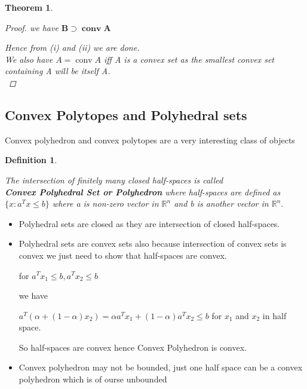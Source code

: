 \documentclass[oneside]{book}
\newtheorem{theorem}{Theorem}[section]
\newtheorem{mydef}{Definition}
\begin{document}
\begin{theorem}
\begin{proof}
we have  $ \mathbf{B} \supset \mathbf{\operatorname{conv} A}  $ \par
 Hence from (i) and (ii) we are done. \\
 We also have $A = \operatorname{conv} A$ iff A is a convex set as the smallest convex set containing A will be itself A. \\

 \end{proof}
 
\end{theorem}


 
 
 
 

 
 
 
 
 
 
 
 
 
 
 
 
 
 
 
 
 
 
 
 
 
 
 
 
 
 
 
\subsection{ Convex Polytopes and Polyhedral sets } \label{ss:16}
Convex polyhedron and convex polytopes are a very interesting class of objects 
\begin{mydef} \label{d:5}

The intersection of finitely many closed half-spaces is called \\
\textbf{ Convex Polyhedral Set  or Polyhedron}
 where half-spaces are defined as $\{ x : a^{T}x \leq b\} $  where a is non-zero vector in $\mathbb{R}^n$ and b is another vector in  $\mathbb{R}^n.$  
 
 
\end{mydef}


\begin{itemize}
\item
 Polyhedral sets are closed as they are intersection of closed half-spaces. 
  \item
 Polyhedral sets  are convex sets  also because intersection of convex sets is convex we just need to show that half-spaces are convex.\par
   for $a^{T} x_{1} \leq b, a^{T} x_{2} \leq b$ \par 
 we have 
 
 $a^{T}\left(\alpha +(1- \alpha) x_{2}\right)=\alpha a^{T} x_{1}+(1-\alpha) a^{T} x_{2} \leq b$ 
  for $x_{1} $ and $x_{2}$ in half space.  \par
  So half-spaces are convex hence  Convex Polyhedron  is convex.\par 
  \item
   Convex polyhedron may not be bounded, just one half space can be a convex polyhedron which is of ourse unbounded 
   \end{itemize}
   
\end{document}
